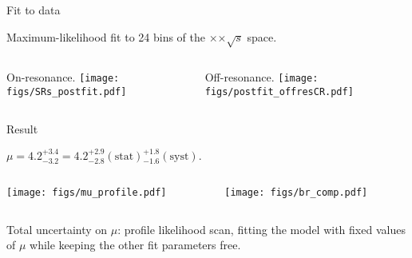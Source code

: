 \begin{frame}{Fit to data}
\bi
\item Maximum-likelihood fit to 24 bins of the \bdtt$\times$\ptK$\times\sqrt{s}$ space.
\ei
\vspace{0.5cm}
\begin{columns}
\begin{column}{0.5\linewidth}
\bi
\item On-resonance.
\ei
\centering
\texttt{[image: figs/SRs\_postfit.pdf]}
\end{column}
\begin{column}{0.5\linewidth}
\bi
\item Off-resonance.
\ei
\centering
\texttt{[image: figs/postfit\_offresCR.pdf]}
\end{column}
\end{columns}\end{frame}
\begin{frame}{Result}
\bi
\item {\small $\mu = 4.2^{+3.4}_{-3.2} = 4.2^{+2.9}_{-2.8}(\mathrm{stat}){}^{+1.8}_{-1.6}(\mathrm{syst})$.}
\ei
\begin{columns}
\begin{column}{0.45\linewidth}
\centering
\texttt{[image: figs/mu\_profile.pdf]}
\end{column}
\begin{column}{0.55\linewidth}
\centering
\texttt{[image: figs/br\_comp.pdf]}
\end{column}
\end{columns}
\bi
\item Total uncertainty on $\mu$: profile likelihood scan, fitting the model with fixed values of $\mu$ while keeping the other fit parameters free.
\ei
\end{frame}
